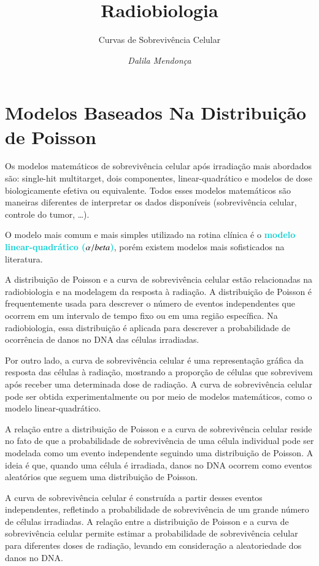 \documentclass[11pt,a4paper]{article}
\title{\LobsterTwo\Huge{Radiobiologia}}
\author{\LobsterTwo\Large{Curvas de Sobrevivência Celular}\nocite{*}}
\date{\LobsterTwo\textit{Dalila Mendonça}}
\begin{document}
	\maketitle

\section{Modelos Baseados Na Distribuição de Poisson}

	Os modelos matemáticos de sobrevivência celular após irradiação mais abordados são: single-hit multitarget, dois componentes, linear-quadrático e modelos de dose biologicamente efetiva ou equivalente. Todos esses modelos matemáticos são maneiras diferentes de interpretar os dados disponíveis (sobrevivência celular, controle do tumor, \dots).

  	O modelo mais comum e mais simples utilizado na rotina clínica é o \textcolor{DarkTurquoise}{\large\LobsterTwo\textbf{modelo linear-quadrático ($\mathbf\mathrm{\alpha/beta}$)}}, porém existem modelos mais sofisticados na literatura. 

	A distribuição de Poisson e a curva de sobrevivência celular estão relacionadas na radiobiologia e na modelagem da resposta à radiação. A distribuição de Poisson é frequentemente usada para descrever o número de eventos independentes que ocorrem em um intervalo de tempo fixo ou em uma região específica. Na radiobiologia, essa distribuição é aplicada para descrever a probabilidade de ocorrência de danos no DNA das células irradiadas.

	Por outro lado, a curva de sobrevivência celular é uma representação gráfica da resposta das células à radiação, mostrando a proporção de células que sobrevivem após receber uma determinada dose de radiação. A curva de sobrevivência celular pode ser obtida experimentalmente ou por meio de modelos matemáticos, como o modelo linear-quadrático. 

	A relação entre a distribuição de Poisson e a curva de sobrevivência celular reside no fato de que a probabilidade de sobrevivência de uma célula individual pode ser modelada como um evento independente seguindo uma distribuição de Poisson. A ideia é que, quando uma célula é irradiada, danos no DNA ocorrem como eventos aleatórios que seguem uma distribuição de Poisson.

	A curva de sobrevivência celular é construída a partir desses eventos independentes, refletindo a probabilidade de sobrevivência de um grande número de células irradiadas. A relação entre a distribuição de Poisson e a curva de sobrevivência celular permite estimar a probabilidade de sobrevivência celular para diferentes doses de radiação, levando em consideração a aleatoriedade dos danos no DNA.
\end{document}
